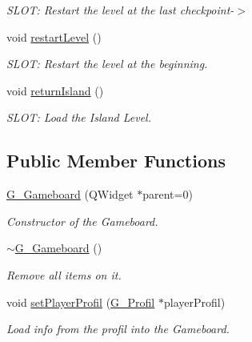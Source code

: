 \begin{DoxyCompactItemize}
\begin{DoxyCompactList}\small\item\em S\+L\+O\+T\+: Restart the level at the last checkpoint-\/$>$ \end{DoxyCompactList}\item 
\hypertarget{class_g___gameboard_aa7e2e09932f2f0859009abaa99c53ada}{}void \hyperlink{class_g___gameboard_aa7e2e09932f2f0859009abaa99c53ada}{restart\+Level} ()\label{class_g___gameboard_aa7e2e09932f2f0859009abaa99c53ada}

\begin{DoxyCompactList}\small\item\em S\+L\+O\+T\+: Restart the level at the beginning. \end{DoxyCompactList}\item 
\hypertarget{class_g___gameboard_a536b6194e02960ac47ad54d5e8647afc}{}void \hyperlink{class_g___gameboard_a536b6194e02960ac47ad54d5e8647afc}{return\+Island} ()\label{class_g___gameboard_a536b6194e02960ac47ad54d5e8647afc}

\begin{DoxyCompactList}\small\item\em S\+L\+O\+T\+: Load the Island Level. \end{DoxyCompactList}\end{DoxyCompactItemize}
\subsection*{Public Member Functions}
\begin{DoxyCompactItemize}
\item 
\hyperlink{class_g___gameboard_ae6ae7653d9dfe58687423ea159198b03}{G\+\_\+\+Gameboard} (Q\+Widget $\ast$parent=0)
\begin{DoxyCompactList}\small\item\em Constructor of the Gameboard. \end{DoxyCompactList}\item 
\hypertarget{class_g___gameboard_ac0188a03ee6d69b116b9e225faa264f0}{}\hyperlink{class_g___gameboard_ac0188a03ee6d69b116b9e225faa264f0}{$\sim$\+G\+\_\+\+Gameboard} ()\label{class_g___gameboard_ac0188a03ee6d69b116b9e225faa264f0}

\begin{DoxyCompactList}\small\item\em Remove all items on it. \end{DoxyCompactList}\item 
void \hyperlink{class_g___gameboard_a3742b642a0654410d81415107b70629c}{set\+Player\+Profil} (\hyperlink{class_g___profil}{G\+\_\+\+Profil} $\ast$player\+Profil)
\begin{DoxyCompactList}\small\item\em Load info from the profil into the Gameboard. \end{DoxyCompactList}\end{DoxyCompactItemize}
